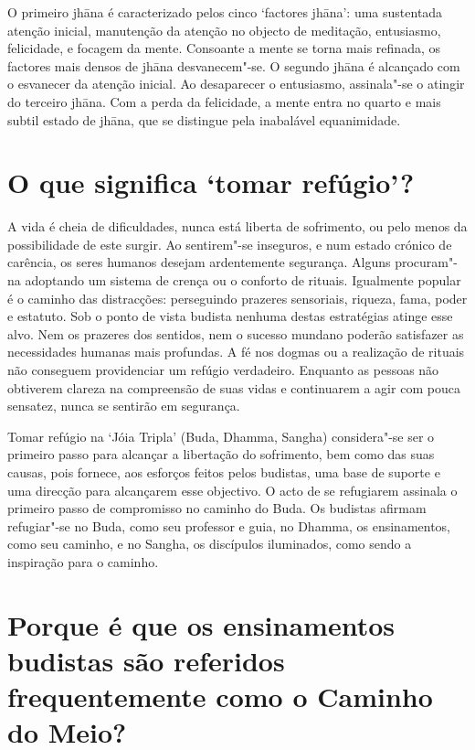O primeiro jhāna é caracterizado pelos cinco `factores jhāna': uma
sustentada atenção inicial, manutenção da atenção no objecto de
meditação, entusiasmo, felicidade, e focagem da mente. Consoante a mente
se torna mais refinada, os factores mais densos de jhāna desvanecem"-se.
O segundo jhāna é alcançado com o esvanecer da atenção inicial. Ao
desaparecer o entusiasmo, assinala"-se o atingir do terceiro jhāna. Com a
perda da felicidade, a mente entra no quarto e mais subtil estado de
jhāna, que se distingue pela inabalável equanimidade.

\section{O que significa `tomar refúgio'?}

A vida é cheia de dificuldades, nunca está liberta de sofrimento, ou
pelo menos da possibilidade de este surgir. Ao sentirem"-se inseguros, e
num estado crónico de carência, os seres humanos desejam ardentemente
segurança. Alguns procuram"-na adoptando um sistema de crença ou o
conforto de rituais. Igualmente popular é o caminho das distracções:
perseguindo prazeres sensoriais, riqueza, fama, poder e estatuto. Sob o
ponto de vista budista nenhuma destas estratégias atinge esse alvo. Nem
os prazeres dos sentidos, nem o sucesso mundano poderão satisfazer as
necessidades humanas mais profundas. A fé nos dogmas ou a realização de
rituais não conseguem providenciar um refúgio verdadeiro. Enquanto as
pessoas não obtiverem clareza na compreensão de suas vidas e continuarem
a agir com pouca sensatez, nunca se sentirão em segurança.

Tomar refúgio na `Jóia Tripla' (Buda, Dhamma, Sangha) considera"-se
ser o primeiro passo para alcançar a libertação do sofrimento, bem como
das suas causas, pois fornece, aos esforços feitos pelos budistas, uma
base de suporte e uma direcção para alcançarem esse objectivo. O acto de
se refugiarem assinala o primeiro passo de compromisso no caminho do
Buda. Os budistas afirmam refugiar"-se no Buda, como seu professor e
guia, no Dhamma, os ensinamentos, como seu caminho, e no Sangha, os
discípulos iluminados, como sendo a inspiração para o caminho.

\section{Porque é que os ensinamentos budistas são referidos frequentemente como
  o Caminho do Meio?}

